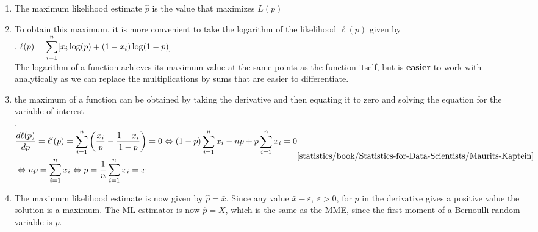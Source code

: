 \begin{enumerate}
    \item The maximum likelihood estimate $\hat{p}$ is the value that maximizes $L ( p)$
    \hfill \cite{statistics/book/Statistics-for-Data-Scientists/Maurits-Kaptein}

    \item To obtain this maximum, it is more convenient to take the logarithm of the likelihood $\ell( p)$ given by
    \hfill \cite{statistics/book/Statistics-for-Data-Scientists/Maurits-Kaptein}
    \\
    .\hfill
    $
         \ell(p)
         = \displaystyle\sum ^n _{i=1} [x _i \log ( p) + (1 - x_ i ) \log (1 - p)]
    $
    \hfill \cite{statistics/book/Statistics-for-Data-Scientists/Maurits-Kaptein}
    \\
    The logarithm of a function achieves its maximum value at the same points as the function itself, but is \textbf{easier} to work with analytically as we can replace the multiplications by sums that are easier to differentiate.
    \hfill \cite{statistics/book/Statistics-for-Data-Scientists/Maurits-Kaptein}

    \item the maximum of a function can be obtained by taking the derivative and then equating it to zero and solving the equation for the variable of interest
    \hfill \cite{statistics/book/Statistics-for-Data-Scientists/Maurits-Kaptein}
    \\[0.2cm]
    .\hfill
    $
        \begin{aligned}
            &\dfrac{d \ell(p)}{dp}
            = \ell^\prime ( p)
            = \dsum ^n _{i=1} \dParenBrac{\dfrac{x _i}{p} - \dfrac{1 - x_ i} {1 - p}} = 0
            \Leftrightarrow (1 - p) \dsum^n _{i=1} x_ i - np + p \dsum^n _{i=1} x_ i = 0 \\
            &\Leftrightarrow np = \dsum^n _{i=1} x_ i
            \Leftrightarrow p = \dfrac{1}{n} \dsum^n _{i=1} x_ i = \bar{x}
        \end{aligned}
        \hfill \text{\cite{statistics/book/Statistics-for-Data-Scientists/Maurits-Kaptein}}
    $

    \item The maximum likelihood estimate is now given by $\hat{p} = \bar{x}$.
    Since any value $\bar{x} - \varepsilon,\ \varepsilon > 0$, for $p$ in the derivative gives a positive value the solution is a maximum.
    The ML estimator is now $\hat{p} = \bar{X}$, which is the same as the MME, since the first moment of a Bernoulli random variable is $p$.
    \hfill \cite{statistics/book/Statistics-for-Data-Scientists/Maurits-Kaptein}


\end{enumerate}



